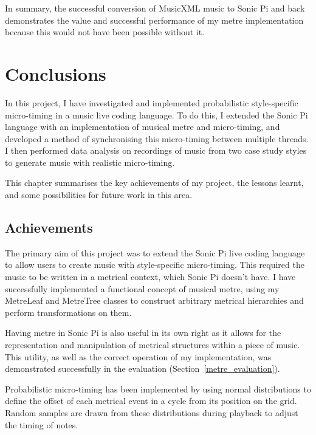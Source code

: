 \documentclass[12pt,twoside,openright]{report}
\begin{document}
In summary, the successful conversion of MusicXML music to Sonic Pi and back
demonstrates the value and successful performance of my metre implementation
because this would not have been possible without it.





\chapter{Conclusions} \label{conclusions}

In this project, I have investigated and implemented probabilistic
style-specific micro-timing in a music live coding language. To do this, I
extended the Sonic Pi language with an implementation of musical metre and
micro-timing, and developed a method of synchronising this micro-timing between
multiple threads. I then performed data analysis on recordings of music from two
case study styles to generate music with realistic micro-timing.

This chapter summarises the key achievements of my project, the lessons learnt,
and some possibilities for future work in this area.



\section{Achievements} \label{achievements}

The primary aim of this project was to extend the Sonic Pi live coding language
to allow users to create music with style-specific micro-timing. This required
the music to be written in a metrical context, which Sonic Pi doesn't have. I
have successfully implemented a functional concept of musical metre, using my
MetreLeaf and MetreTree classes to construct arbitrary metrical hierarchies and
perform transformations on them.

Having metre in Sonic Pi is also useful in its own right as it allows for the
representation and manipulation of metrical structures within a piece of music.
This utility, as well as the correct operation of my implementation, was
demonstrated successfully in the evaluation (Section~\ref{metre_evaluation}).

Probabilistic micro-timing has been implemented by using normal distributions to
define the offset of each metrical event in a cycle from its position on the
grid. Random samples are drawn from these distributions during playback to
adjust the timing of notes.
\end{document}
